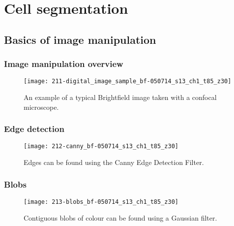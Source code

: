 
\chapter{Cell segmentation}

\ifpdf
    \graphicspath{{Chapter2/Figs/Raster/}{Chapter2/Figs/PDF/}{Chapter2/Figs/}}
\else
    \graphicspath{{Chapter2/Figs/Vector/}{Chapter2/Figs/}}
\fi

\section{Basics of image manipulation}

\subsection{Image manipulation overview}

\begin{figure}[htbp!]
\centering
\texttt{[image: 211-digital\_image\_sample\_bf-050714\_s13\_ch1\_t85\_z30]}
\caption[Brightfield image sample]{An example of a typical Brightfield image taken with a confocal microscope.}
\label{fig:digital_image_sample_bf}
\end{figure}

\subsection{Edge detection}

\begin{figure}[htbp!]
\centering
\texttt{[image: 212-canny\_bf-050714\_s13\_ch1\_t85\_z30]}
\caption[The canny filter]{Edges can be found using the Canny Edge Detection Filter.}
\label{fig:canny_filter_bf}
\end{figure}

\subsection{Blobs}

\begin{figure}[htbp!]
\centering
\texttt{[image: 213-blobs\_bf-050714\_s13\_ch1\_t85\_z30]}
\caption[Blob detection]{Contiguous blobs of colour can be found using a Gaussian filter.}
\label{fig:blob_detection_bf}
\end{figure}

